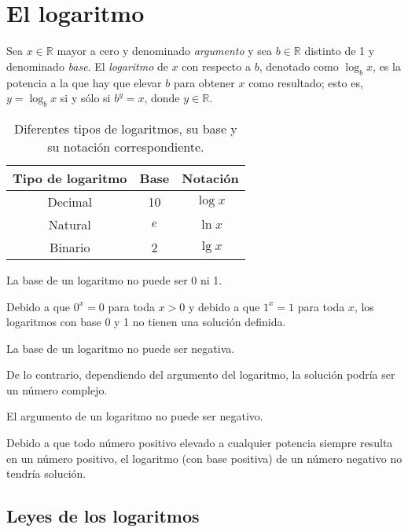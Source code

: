 \chapter{El logaritmo}

Sea \(x\in\mathbb{R}\) mayor a cero y denominado \emph{argumento} y sea \(b\in\mathbb{R}\) distinto de 1 y denominado \emph{base}.
El \emph{logaritmo} de \(x\) con respecto a \(b\), denotado como \(\log_{b}x\), es la potencia a la que hay que elevar \(b\) para obtener \(x\) como resultado; esto es, \(y=\log_{b}x\) si y sólo si \(b^{y}=x\), donde \(y\in\mathbb{R}\).

\begin{table}[h]
  \caption{Diferentes tipos de logaritmos, su base y su notación correspondiente.}
  \begin{center}
    \begin{tabular}{ccc}
      \toprule
      Tipo de logaritmo & Base & Notación \\
      \midrule
      Decimal & 10 & \(\log{x}\) \\
      Natural & \(e\) & \(\ln{x}\) \\
      Binario & 2 & \(\lg{x}\) \\
      \bottomrule
    \end{tabular}
  \end{center}
\end{table}

\begin{prop}
  La base de un logaritmo no puede ser 0 ni 1.
\end{prop}
  
Debido a que \(0^x=0\) para toda \(x>0\) y debido a que \(1^x=1\) para toda \(x\), los logaritmos con base 0 y 1 no tienen una solución definida.

\begin{prop}
  La base de un logaritmo no puede ser negativa.
\end{prop}

De lo contrario, dependiendo del argumento del logaritmo, la solución podría ser un número complejo.

\begin{prop}
  El argumento de un logaritmo no puede ser negativo.
\end{prop}

Debido a que todo número positivo elevado a cualquier potencia siempre resulta en un número positivo, el logaritmo (con base positiva) de un número negativo no tendría solución.

\section{Leyes de los logaritmos}

